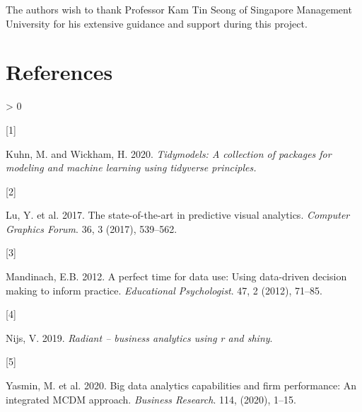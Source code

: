 \documentclass{acm_proc_article-sp}
\newlength{\csllabelwidth}
\newlength{\cslhangindent}
\newenvironment{CSLReferences}[3] %
 {%
  \setlength{\parindent}{0pt}
  \ifodd #1 \everypar{\setlength{\hangindent}{\cslhangindent}}\ignorespaces\fi
  \ifnum #2 > 0
  \setlength{\parskip}{#2\baselineskip}
  \fi
 }%
 {}
\newcommand{\CSLLeftMargin}[1]{\parbox[t]{\csllabelwidth}{#1}}
\newcommand{\CSLRightInline}[1]{\parbox[t]{\linewidth - \csllabelwidth}{#1}}
\begin{document}
The authors wish to thank Professor Kam Tin Seong of Singapore
Management University for his extensive guidance and support during this
project.

\hypertarget{references}{%
\section*{References}\label{references}}

\hypertarget{refs}{}
\begin{CSLReferences}{0}{0}
\leavevmode\hypertarget{ref-tidymodels2020}{}%
\CSLLeftMargin{{[}1{]} }
\CSLRightInline{Kuhn, M. and Wickham, H. 2020. \emph{Tidymodels: A
collection of packages for modeling and machine learning using tidyverse
principles.}}

\leavevmode\hypertarget{ref-https:ux2fux2fdoi.orgux2f10.1111ux2fcgf.13210}{}%
\CSLLeftMargin{{[}2{]} }
\CSLRightInline{Lu, Y. et al. 2017. The state-of-the-art in predictive
visual analytics. \emph{Computer Graphics Forum}. 36, 3 (2017),
539--562.}

\leavevmode\hypertarget{ref-doi:10.1080ux2f00461520.2012.667064}{}%
\CSLLeftMargin{{[}3{]} }
\CSLRightInline{Mandinach, E.B. 2012. A perfect time for data use: Using
data-driven decision making to inform practice. \emph{Educational
Psychologist}. 47, 2 (2012), 71--85.}

\leavevmode\hypertarget{ref-radiant2019}{}%
\CSLLeftMargin{{[}4{]} }
\CSLRightInline{Nijs, V. 2019. \emph{Radiant -- business analytics using
r and shiny}.}

\leavevmode\hypertarget{ref-https:ux2fux2fdoi.orgux2f10.1016ux2fj.jbusres.2020.03.028}{}%
\CSLLeftMargin{{[}5{]} }
\CSLRightInline{Yasmin, M. et al. 2020. Big data analytics capabilities
and firm performance: An integrated MCDM approach. \emph{Business
Research}. 114, (2020), 1--15.}

\end{CSLReferences}
\setlength{\parindent}{0in}
\end{document}
